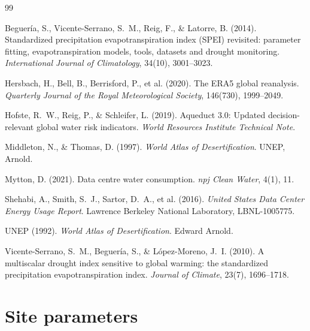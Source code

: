 \documentclass[11pt,a4paper]{article}
\begin{document}
\begin{thebibliography}{99}

Beguer\'ia, S., Vicente-Serrano, S.~M., Reig, F., \& Latorre, B. (2014).
Standardized precipitation evapotranspiration index (SPEI) revisited: parameter fitting, evapotranspiration models, tools, datasets and drought monitoring.
\emph{International Journal of Climatology}, 34(10), 3001--3023.

Hersbach, H., Bell, B., Berrisford, P., et al. (2020).
The ERA5 global reanalysis.
\emph{Quarterly Journal of the Royal Meteorological Society}, 146(730), 1999--2049.

Hofste, R.~W., Reig, P., \& Schleifer, L. (2019).
Aqueduct 3.0: Updated decision-relevant global water risk indicators.
\emph{World Resources Institute Technical Note}.

Middleton, N., \& Thomas, D. (1997).
\emph{World Atlas of Desertification}.
UNEP, Arnold.

Mytton, D. (2021).
Data centre water consumption.
\emph{npj Clean Water}, 4(1), 11.

Shehabi, A., Smith, S.~J., Sartor, D.~A., et al. (2016).
\emph{United States Data Center Energy Usage Report}.
Lawrence Berkeley National Laboratory, LBNL-1005775.

UNEP (1992).
\emph{World Atlas of Desertification}.
Edward Arnold.

Vicente-Serrano, S.~M., Beguer\'ia, S., \& L\'opez-Moreno, J.~I. (2010).
A multiscalar drought index sensitive to global warming: the standardized precipitation evapotranspiration index.
\emph{Journal of Climate}, 23(7), 1696--1718.

\end{thebibliography}

\appendix

\section{Site parameters}
\end{document}
